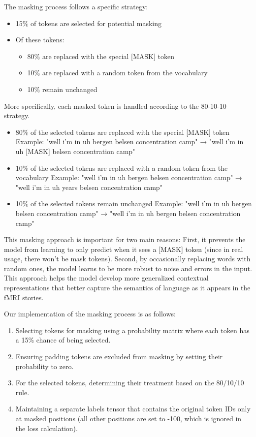 \documentclass[12pt,letterpaper]{article}
\begin{document}
The masking process follows a specific strategy:

\begin{itemize}
    \item 15\% of tokens are selected for potential masking
    \item Of these tokens:
    \begin{itemize}
        \item 80\% are replaced with the special [MASK] token
        \item 10\% are replaced with a random token from the vocabulary
        \item 10\% remain unchanged
    \end{itemize}
\end{itemize}

More specifically, each masked token is handled according to the 80-10-10 strategy.

\begin{itemize}
         \item 80\% of the selected tokens are replaced with the special [MASK] token Example: "well i'm in uh bergen belsen concentration camp" → "well i'm in uh [MASK] belsen concentration camp"
    
        \item 10\% of the selected tokens are replaced with a random token from the vocabulary Example: "well i'm in uh bergen belsen concentration camp" → "well i'm in uh years belsen concentration camp"
        \item  10\% of the selected tokens remain unchanged Example: "well i'm in uh bergen belsen concentration camp" → "well i'm in uh bergen belsen concentration camp"

   
\end{itemize}



This masking approach is important for two main reasons: First, it prevents the model from learning to only predict when it sees a [MASK] token (since in real usage, there won't be mask tokens). Second, by occasionally replacing words with random ones, the model learns to be more robust to noise and errors in the input. This approach helps the model develop more generalized contextual representations that better capture the semantics of language as it appears in the fMRI stories.



Our implementation of the masking process is as follows:
\begin{enumerate}
    \item Selecting tokens for masking using a probability matrix where each token has a 15\% chance of being selected.
    \item Ensuring padding tokens are excluded from masking by setting their probability to zero.
    \item For the selected tokens, determining their treatment based on the 80/10/10 rule.
    \item Maintaining a separate labels tensor that contains the original token IDs only at masked positions (all other positions are set to -100, which is ignored in the loss calculation).
\end{enumerate}
\end{document}
